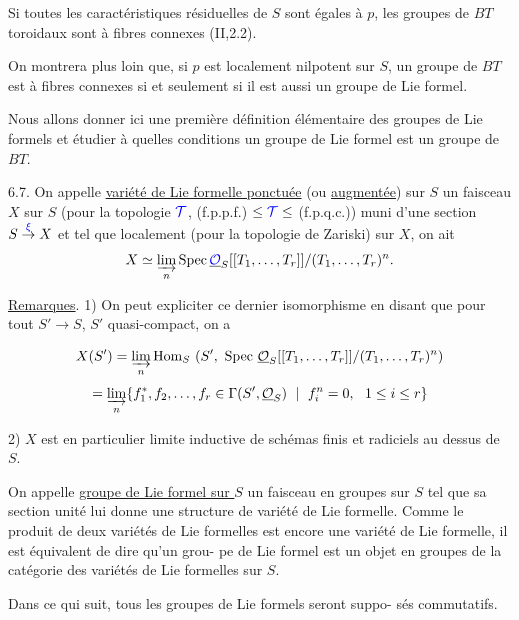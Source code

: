 \documentclass[11pt]{article}
\newcommand{\scanpage}[1]{\par\bigskip\noindent{\small\sffamily[scan #1]}\par}
\newcommand{\mspage}[1]{{\small\sffamily[p.\,#1]}}
\newcommand{\hand}[1]{\textcolor{blue}{#1}}
\newcommand{\uline}[1]{\underline{#1}}
\newcommand{\unsure}[1]{[#1?]}
\begin{document}
Si toutes les caractéristiques résiduelles de $S$ sont égales
à $p$, les groupes de $BT$ toroidaux sont à fibres connexes (II,2.2).

On montrera plus loin que, si $p$ est localement nilpotent sur
$S$, un groupe de $BT$ est à fibres connexes si et seulement si il est
aussi un groupe de Lie formel.

Nous allons donner ici une première définition élémentaire des
groupes de Lie formels et étudier à quelles conditions un groupe de Lie
formel est un groupe de $BT$.

6.7. On appelle \uline{variété de Lie formelle ponctuée} (ou \uline{augmentée}) sur
$S$ un faisceau $X$ sur $S$ (pour la topologie $\hand{\mathcal{T}}$, (f.p.p.f.) $\leq \hand{\mathcal{T}} \leq$ (f.p.q.c.))
muni d'une section $S \overset{\hand{\xi}}{\to} X$ et tel que localement (pour la topologie de
Zariski) sur $X$, on ait
\[
X \simeq \varinjlim_{n} \operatorname{Spec} \underline{\hand{\mathcal{O}}}_S[[T_1,\ldots,T_r]]/(T_1,\ldots,T_r)^n .
\]

\uline{Remarques}. 1) On peut expliciter ce dernier isomorphisme en disant
que pour tout $S' \to S$, $S'$ quasi-compact, on a

\mspage{\hand{70}}

\clearpage
\scanpage{129/71}
\mspage{\hand{III-1\unsure{6}}}

\[
X(S') = \varinjlim_{n} \mathrm{Hom}_S\ (S',\ \mathrm{Spec}\ \underline{\mathcal{O}}_S[[T_1,\ldots,T_r]]/(T_1,\ldots,T_r)^n)
\]
\[
= \varinjlim_{n} \{f_1^*,f_2,\ldots,f_r \in \Gamma(S',\underline{\mathcal{O}}_S)\ \mid\ f_i^n = 0,\ \ 1 \leq i \leq r\}
\]

2) $X$ est en particulier limite inductive de schémas finis
et radiciels au dessus de $S$.

On appelle \uline{groupe de Lie formel sur $S$} un faisceau en groupes
sur $S$ tel que sa section unité lui donne une structure de variété de
Lie formelle. Comme le produit de deux variétés de Lie formelles est
encore une variété de Lie formelle, il est équivalent de dire qu'un grou-%
pe de Lie formel est un objet en groupes de la catégorie des variétés de
Lie formelles sur $S$.

Dans ce qui suit, tous les groupes de Lie formels seront suppo-%
sés commutatifs.
\end{document}

